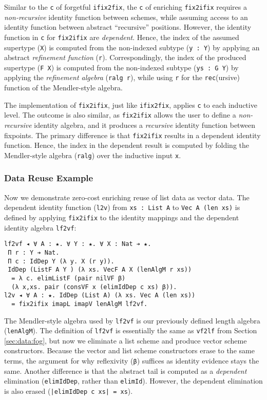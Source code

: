 \documentclass[acmsmall,screen]{acmart}
\newcommand{\refsec}[1]{Section \ref{sec:#1}}
\begin{document}
Similar to the \verb;c; of forgetful \verb;ifix2fix;,
the \verb;c; of enriching \verb;fix2ifix; requires a
\textit{non-recursive} identity function between schemes, while assuming
access to an identity function between abstract ``recursive''
positions. However, the identity function in \verb;c; for
\verb;fix2ifix; are \textit{dependent}. Hence, the index of the
assumed supertype (\verb;X;) is computed from the non-indexed
subtype (\verb;y : Y;) by applying an abstract
\textit{refinement function} (\verb;r;).
Correspondingly, the index of the produced supertype
(\verb;F X;) is computed from the non-indexed
subtype (\verb;ys : G Y;) by applying the
\textit{refinement algebra} (\verb;ralg r;), while using \verb;r; for
the \verb;rec;(ursive) function of the Mendler-style algebra.

The implementation of \verb;fix2ifix;, just like \verb;ifix2fix;,
applies \verb;c; to each inductive level. The outcome is also similar,
as \verb;fix2ifix; allows the user to define a \textit{non-recursive}
identity algebra, and it produces a \textit{recursive} identity
function between fixpoints. The primary difference is
that \verb;fix2ifix; results in a dependent identity function. Hence,
the index in the dependent result is computed by folding
the Mendler-style algebra (\verb;ralg;) over the inductive input
\verb;x;. 

\subsubsection{Data Reuse Example}

Now we demonstrate zero-cost enriching reuse of list data as vector
data. The dependent identity function (\verb;l2v;)
from \verb;xs : List A; to \verb;Vec A (len xs); is defined by
applying \verb;fix2ifix; to the identity mappings and the
dependent identity algebra \verb;lf2vf;:
\begin{verbatim}
lf2vf ◂ ∀ A : ★. ∀ Y : ★. ∀ X : Nat ➔ ★.
 Π r : Y ➔ Nat. 
 Π c : IdDep Y (λ y. X (r y)).
 IdDep (ListF A Y ) (λ xs. VecF A X (lenAlgM r xs))
  = λ c. elimListF (pair nilVF β)
  (λ x,xs. pair (consVF x (elimIdDep c xs) β)).
l2v ◂ ∀ A : ★. IdDep (List A) (λ xs. Vec A (len xs))
  = fix2ifix imapL imapV lenAlgM lf2vf.
\end{verbatim}
The Mendler-style algebra used by \verb;lf2vf; is our previously
defined length algebra (\verb;lenAlgM;).
The definition of \verb;lf2vf; is essentially the same as
\verb;vf2lf; from \refsec{data:fog}, but now we eliminate a list
scheme and produce vector scheme constructors. Because the vector and
list scheme constructors erase to the same terms, the argument for why
reflexivity (\verb;β;) suffices as identity evidence stays the same.
Another difference is that the abstract tail is computed as a \textit{dependent}
elimination (\verb;elimIdDep;, rather than \verb;elimId;).
However, the dependent elimination is also erased
(\verb;|elimIdDep c xs| = xs;).
\end{document}
